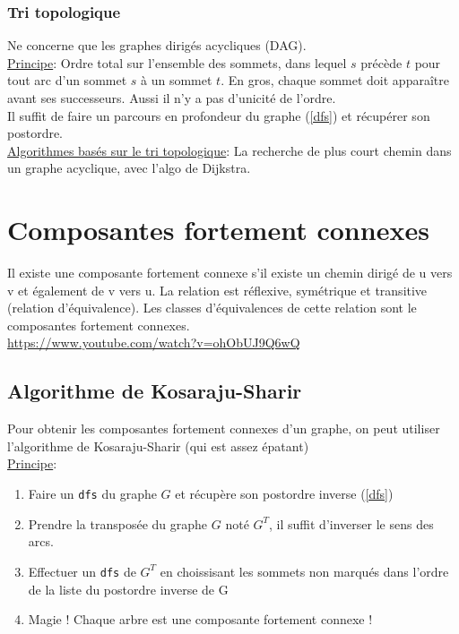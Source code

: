 \documentclass[10pt]{article}
\begin{document}
\subsubsection{Tri topologique}
\label{topo}
Ne concerne que les graphes dirigés acycliques (DAG).
\\\underline{Principe}: Ordre total sur l'ensemble des sommets, dans lequel $s$ précède $t$ pour tout arc d'un sommet $s$ à un sommet $t$. En gros, chaque sommet doit apparaître avant ses successeurs. Aussi il n'y a pas d'unicité de l'ordre.
\\ Il suffit de faire un parcours en profondeur du graphe (\ref{dfs}) et récupérer son postordre.
\\\underline{Algorithmes basés sur le tri topologique}: La recherche de plus court chemin dans un graphe acyclique, avec l'algo de Dijkstra.

\section{Composantes fortement connexes}
\label{cfc}
Il existe une composante fortement connexe s'il existe un chemin dirigé de u vers v et également de v vers u. La relation est réflexive, symétrique et transitive (relation d'équivalence). Les classes d'équivalences de cette relation sont le composantes fortement connexes.
\\\url{https://www.youtube.com/watch?v=ohObUJ9Q6wQ}
\subsection{Algorithme de Kosaraju-Sharir}
\label{Kosaraju}
Pour obtenir les composantes fortement connexes d'un graphe, on peut utiliser l'algorithme de Kosaraju-Sharir (qui est assez épatant)
\\\underline{Principe}:
\begin{enumerate}
\item Faire un \verb|dfs| du graphe $G$ et récupère son postordre inverse (\ref{dfs})
\item Prendre la transposée du graphe $G$ noté $G^{T}$, il suffit d'inverser le sens des arcs.
\item Effectuer un \verb|dfs| de $G^{T}$ en choissisant les sommets non marqués dans l'ordre de la liste du postordre inverse de G
\item Magie ! Chaque arbre est une composante fortement connexe !
\end{enumerate}
\end{document}
